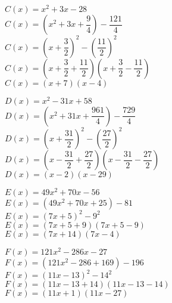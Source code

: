 \begin{minipage}{.5 \textwidth}
$ C(x) = x^2 + 3x - 28 $\\

$ C(x) = \left(x^2+3x+\dfrac{9}{4}\right)-\dfrac{121}{4} $\\

$ C(x) = \left(x+\dfrac{3}{2}\right)^2 - \left(\dfrac{11}{2}\right)^2 $\\

$ C(x) =\left(x + \dfrac{3}{2} + \dfrac{11}{2} \right)\left(x + \dfrac{3}{2} - \dfrac{11}{2}\right) $ \\

$ C(x) =\left(x+7\right)\left(x-4\right) $

\vspace{1cm}

$ D(x) = x^2 - 31x + 58 $\\

$ D(x) = \left(x^2 + 31x + \dfrac{961}{4}\right)-\dfrac{729}{4} $\\

$ D(x) = \left(x+\dfrac{31}{2}\right)^2 - \left(\dfrac{27}{2}\right)^2 $\\

$ D(x) = \left(x - \dfrac{31}{2} + \dfrac{27}{2} \right)\left(x - \dfrac{31}{2} - \dfrac{27}{2} \right) $\\

$ D(x) = \left(x - 2 \right)\left(x - 29 \right) $
\end{minipage}
\begin{minipage}{.5 \textwidth}


$ E(x) = 49x^2+70x-56 $\\

$ E(x) = \left(49x^2 + 70x + 25\right)- 81 $\\

$ E(x) = \left(7x+5\right)^2 - 9^2 $\\

$ E(x) = \left(7x+5+9\right)\left(7x+5-9\right) $\\

$ E(x) = \left(7x + 14\right)\left(7x-4\right) $


\vspace{1cm}

$ F(x) = 121x^2 - 286x - 27 $\\

$ F(x) = \left(121x^2 - 286 + 169\right)-196 $\\

$ F(x) = \left(11x-13\right)^2-14^2 $\\

$ F(x) = \left(11x-13+14\right)\left(11x-13-14\right) $\\

$ F(x) = \left(11x +1\right)\left(11x-27\right) $
\end{minipage}
\newpage 

